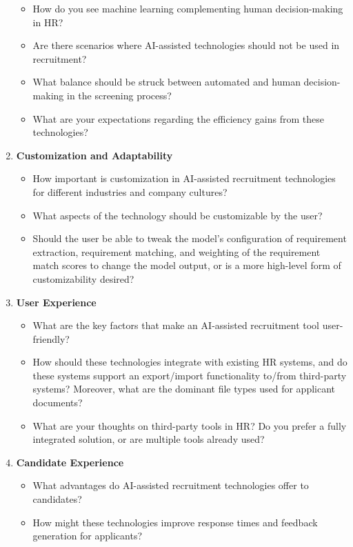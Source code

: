 \documentclass[draft,final]{thesisclass} %
\begin{document}
\begin{enumerate}
    \begin{itemize}
        \item How do you see machine learning complementing human decision-making in \acs{HR}?
        \item Are there scenarios where \acs{AI}-assisted technologies should not be used in recruitment?
        \item What balance should be struck between automated and human decision-making in the screening process?
        \item What are your expectations regarding the efficiency gains from these technologies?
    \end{itemize}
    \item \textbf{Customization and Adaptability}
    \begin{itemize}
        \item How important is customization in \acs{AI}-assisted recruitment technologies for different industries and company cultures?
        \item What aspects of the technology should be customizable by the user?
        \item Should the user be able to tweak the model's configuration of requirement extraction, requirement matching, and weighting of the requirement match scores to change the model output, or is a more high-level form of customizability desired?
    \end{itemize}
    \item \textbf{User Experience}
    \begin{itemize}
        \item What are the key factors that make an \acs{AI}-assisted recruitment tool user-friendly?
        \item How should these technologies integrate with existing \acs{HR} systems, and do these systems support an export/import functionality to/from third-party systems? Moreover, what are the dominant file types used for applicant documents?
        \item What are your thoughts on third-party tools in HR? Do you prefer a fully integrated solution, or are multiple tools already used?
    \end{itemize}
    \item \textbf{Candidate Experience}
    \begin{itemize}
        \item What advantages do \acs{AI}-assisted recruitment technologies offer to candidates?
        \item How might these technologies improve response times and feedback generation for applicants?

\end{itemize}
\end{enumerate}
\end{document}
